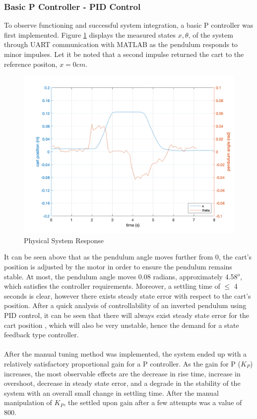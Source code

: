 \documentclass[12pt]{article}
\begin{document}
\subsubsection{Basic P Controller - PID Control}
To observe functioning and successful system integration, a basic P controller was first implemented. Figure \ref{fig:step} displays the measured states $x, \theta$, of the system through UART communication with MATLAB as the pendulum responds to minor impulses. Let it be noted that a second impulse returned the cart to the reference positon, $x=0cm$.
\begin{figure}[H]
    \centering
    \includegraphics[width=.7\linewidth]{figures/nice.png}
    \caption{Physical System Response}
    \label{fig:step}
\end{figure}
It can be seen above that as the pendulum angle moves further from 0, the cart's position is adjusted by the motor in order to ensure the pendulum remains stable. At most, the pendulum angle moves 0.08 radians, approximately 4.58$^o$, which satisfies the controller requirements. Moreover, a settling time of $\leq$ 4 seconds is clear, however there exists steady state error with respect to the cart's position. After a quick analysis of controllability of an inverted pendulum using PID control, it can be seen that there will always exist steady state error for the cart position \cite{pidBad}, which will also be very unstable, hence the demand for a state feedback type controller.
\\\\
After the manual tuning method was implemented, the system ended up with a relatively satisfactory proportional gain for a P controller. As the gain for P ($K_P$) increases, the most observable effects are the decrease in rise time, increase in overshoot, decrease in steady state error, and a degrade in the stability of the system with an overall small change in settling time. After the manual manipulation of $K_P$, the settled upon gain after a few attempts was a value of $800$.  
\end{document}
